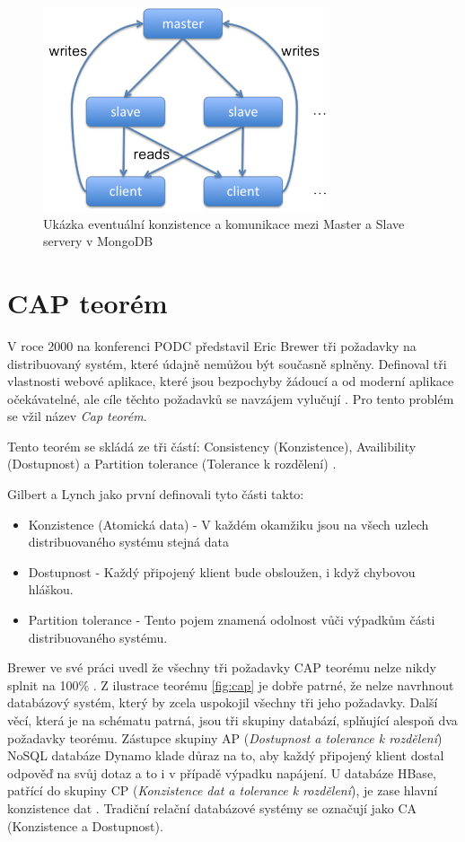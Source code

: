\begin{figure}[h]
\begin{centering}
\includegraphics[scale=1.5]{obrazky/master-slave}
\par\end{centering}
\caption{Ukázka eventuální konzistence a komunikace mezi Master a Slave servery v MongoDB \cite{mongoConsist}}
\end{figure}
\pagebreak
\section{CAP teorém}
V roce 2000 na konferenci PODC představil Eric Brewer tři požadavky na distribuovaný systém, které údajně nemůžou být současně splněny. Definoval tři vlastnosti webové aplikace, které jsou bezpochyby žádoucí a od moderní aplikace očekávatelné, ale cíle těchto požadavků se navzájem vylučují \cite{gilbertCap}. Pro tento problém se vžil název \emph{Cap teorém}.

Tento teorém se skládá ze tři částí: Consistency (Konzistence), Availibility (Dostupnost) a Partition tolerance (Tolerance k rozdělení) \cite{cap}.

\vspace{0.25cm}
\noindent Gilbert a Lynch jako první definovali tyto části takto: \cite{gilbertCap}
\begin{itemize}
\item Konzistence (Atomická data) - V každém okamžiku jsou na všech uzlech distribuovaného systému stejná data
\item Dostupnost - Každý připojený klient bude obsloužen, i když chybovou hláškou.
\item Partition tolerance - Tento pojem znamená odolnost vůči výpadkům části distribuovaného systému.
\end{itemize}
Brewer ve své práci uvedl že všechny tři požadavky CAP teorému nelze nikdy splnit na 100\%  \cite{cap}. Z ilustrace teorému \ref{fig:cap} je dobře patrné, že nelze navrhnout databázový systém, který by zcela uspokojil všechny tři jeho požadavky. Další věcí, která je na schématu patrná, jsou tři skupiny databází, splňující alespoň dva požadavky teorému. Zástupce skupiny AP (\emph{Dostupnost a tolerance k rozdělení}) NoSQL databáze Dynamo klade důraz na to, aby každý připojený klient dostal odpověď na svůj dotaz a to i v případě výpadku napájení. U databáze HBase, patřící do skupiny CP (\emph{Konzistence dat a tolerance k rozdělení}), je zase hlavní konzistence dat \cite{panykoNosql}. Tradiční relační databázové systémy se označují jako CA (Konzistence a Dostupnost). 

